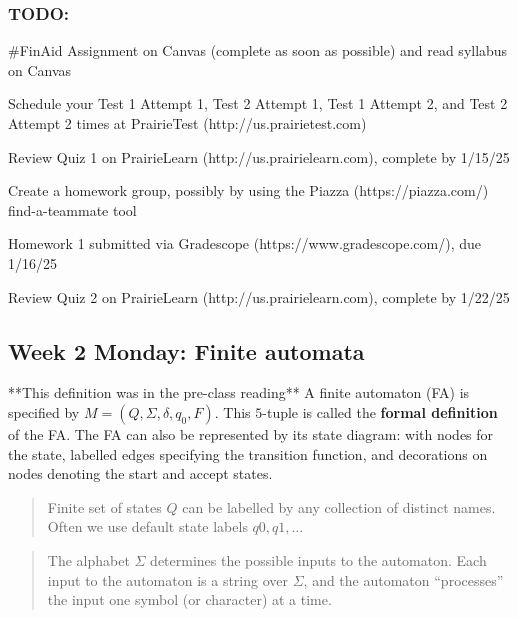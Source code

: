 \documentclass[12pt, oneside]{article}
\begin{document}
\subsubsection*{TODO:}
\begin{list}{\itemsep-10pt}
   \item \#FinAid Assignment on Canvas (complete as soon as possible) and read syllabus on Canvas
   \item Schedule your Test 1 Attempt 1, Test 2 Attempt 1, Test 1 Attempt 2, and Test 2 Attempt 2 times 
   at PrairieTest (http://us.prairietest.com)
   \item Review Quiz 1 on PrairieLearn (http://us.prairielearn.com), complete by 1/15/25
   \item Create a homework group, possibly by using the Piazza (https://piazza.com/) find-a-teammate tool
   \item Homework 1 submitted via Gradescope (https://www.gradescope.com/), due 1/16/25
   \item Review Quiz 2 on PrairieLearn (http://us.prairielearn.com), complete by 1/22/25
\end{list}


\newpage

\subsection*{Week 2 Monday: Finite automata}




**This definition was in the pre-class reading**
A finite automaton (FA) is specified by  $M = (Q, \Sigma, \delta, q_0, F)$.
This $5$-tuple is called the {\bf formal definition} of the FA. The FA can also 
be represented by its state diagram: with nodes for the state, labelled edges specifying the 
transition function, and decorations on nodes denoting the start and accept states.

\begin{quote}
Finite set of states $Q$ can be labelled by any collection of distinct names. Often
we use default state labels $q0, q1, \ldots$ 
\end{quote}

\begin{quote}  
The alphabet $\Sigma$ determines the possible inputs to the automaton. 
Each input to the automaton is a string over  $\Sigma$, and the automaton ``processes'' the input
one symbol (or character) at a time.
\end{quote}
\end{document}

